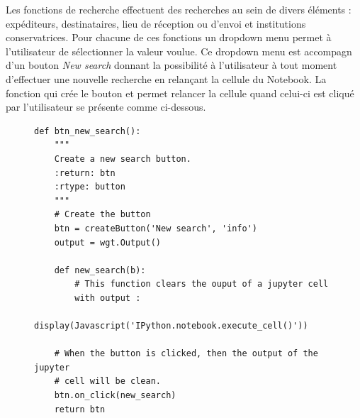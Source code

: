 \documentclass[a4paper, 12pt, twoside]{book}
\begin{document}
Les fonctions de recherche effectuent des recherches au sein de divers éléments : expéditeurs, destinataires, lieu de réception ou d'envoi et institutions conservatrices. Pour chacune de ces fonctions un dropdown menu permet à l'utilisateur de sélectionner la valeur voulue. Ce dropdown menu est accompagn d'un bouton \textit{New search} donnant la possibilité à l'utilisateur à tout moment d'effectuer une nouvelle recherche en relançant la cellule du Notebook. La fonction qui crée le bouton et permet relancer la cellule quand celui-ci est cliqué par l'utilisateur se présente comme ci-dessous.
\begin{figure}[h!]
\begin{lstlisting}
def btn_new_search():
    """
    Create a new search button.
    :return: btn
    :rtype: button
    """
    # Create the button
    btn = createButton('New search', 'info')
    output = wgt.Output()

    def new_search(b):
        # This function clears the ouput of a jupyter cell
        with output : 
            display(Javascript('IPython.notebook.execute_cell()'))
    
    # When the button is clicked, then the output of the jupyter
    # cell will be clean.
    btn.on_click(new_search)
    return btn
\end{lstlisting}
\vspace{-25pt}
\end{figure}
\end{document}
